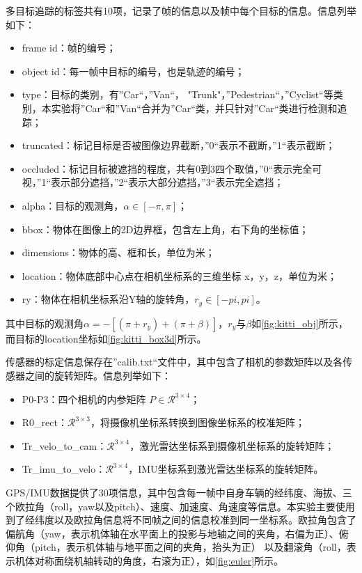多目标追踪的标签共有10项，记录了帧的信息以及帧中每个目标的信息。信息列举如下：
\begin{itemize}
	\item frame id：帧的编号；
	\item object id：每一帧中目标的编号，也是轨迹的编号；
	\item type：目标的类别，有”Car“，”Van“， "Trunk"，”Pedestrian“，”Cyclist“等类别，本实验将”Car“和”Van“合并为”Car“类，并只针对”Car“类进行检测和追踪；
	\item truncated：标记目标是否被图像边界截断，”0“表示不截断，”1“表示截断；
	\item occluded：标记目标被遮挡的程度，共有0到3四个取值，”0“表示完全可视，”1“表示部分遮挡，”2“表示大部分遮挡，”3“表示完全遮挡；
	\item alpha：目标的观测角，$\alpha \in [-\pi, \pi]$；
	\item bbox：物体在图像上的2D边界框，包含左上角，右下角的坐标值；
	\item dimensions：物体的高、框和长，单位为米；
	\item location：物体底部中心点在相机坐标系的三维坐标 x，y，z，单位为米；
	\item ry：物体在相机坐标系沿Y轴的旋转角，$r_y \in [-pi, pi]$。
\end{itemize}
其中目标的观测角$\alpha = -[(\pi+r_y) + (\pi+\beta)]$，$r_y$与$\beta$如\figurename \ref{fig:kitti_obj}所示，而目标的location坐标如\figurename \ref{fig:kitti_box3d}所示。


传感器的标定信息保存在”calib.txt“文件中，其中包含了相机的参数矩阵以及各传感器之间的旋转矩阵。信息列举如下：
\begin{itemize}
	\item P0-P3：四个相机的内参矩阵 $P \in \mathcal{R}^{3\times 4}$；
	\item R0\_rect：$\mathcal{R}^{3\times 3}$，将摄像机坐标系转换到图像坐标系的校准矩阵；
	\item Tr\_velo\_to\_cam：$\mathcal{R}^{3\times 4}$，激光雷达坐标系到摄像机坐标系的旋转矩阵；
	\item Tr\_imu\_to\_velo：$\mathcal{R}^{3\times 4}$，IMU坐标系到激光雷达坐标系的旋转矩阵。
\end{itemize}

GPS/IMU数据提供了30项信息，其中包含每一帧中自身车辆的经纬度、海拔、三个欧拉角（roll，yaw以及pitch）、速度、加速度、角速度等信息。本实验主要使用到了经纬度以及欧拉角信息将不同帧之间的信息校准到同一坐标系。欧拉角包含了偏航角（yaw，表示机体轴在水平面上的投影与地轴之间的夹角，右偏为正）、俯仰角（pitch，表示机体轴与地平面之间的夹角，抬头为正） 以及翻滚角（roll，表示机体对称面绕机轴转动的角度，右滚为正），如\figurename \ref{fig:euler}所示。



